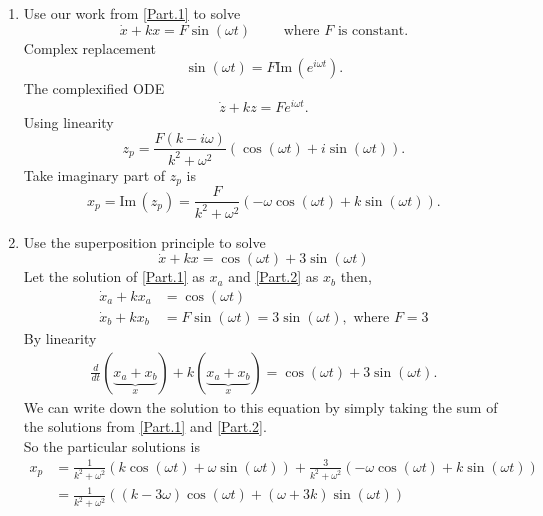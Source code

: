 \begin{enumerate}[label=\textbf{Part.\arabic*}]
\item \label{Part.2}Use our work from \ref{Part.1} to solve
  \begin{equation*}
    \dot{x} + kx = F \sin (\omega t) \qquad \text{ where } F \text{ is constant}.
  \end{equation*}
  Complex replacement
  \begin{equation*}
    \sin (\omega t) = F \mathrm{Im\, }(e^{i \omega t}).
  \end{equation*}
  The complexified ODE
  \begin{equation*}
    \dot{z} + kz = Fe^{i \omega t}. 
  \end{equation*}
  Using linearity
  \begin{equation*}
    z_ p = \frac{F \left(k - i \omega \right)}{k^2 + \omega ^2}
    \left( \cos (\omega t) + i \sin (\omega t) \right). 
  \end{equation*}
  Take imaginary part of $z_ p$ is
  \begin{equation*}
    x_ p = \mathrm{Im\, } (z_ p)
    = \frac{F}{k^2 + \omega ^2} \left( - \omega \cos (\omega t) + k \sin (\omega t) \right). 
  \end{equation*}
  
\item Use the superposition principle to solve
  \begin{equation*}
    \dot{x} + kx =  \cos (\omega t) + 3 \sin (\omega t)
  \end{equation*}
  Let the solution of \ref{Part.1} as $x_a$ and \ref{Part.2} as $x_b$ then,
  \begin{align*}
    \dot{x}_ a + kx_ a &= \cos (\omega t) \\
    \dot{x}_ b + kx_ b &= F \sin (\omega t) = 3 \sin (\omega t), \text{ where } F = 3
  \end{align*}
  By linearity
  \begin{align*}
    \frac{d}{dt} (\underbrace{x_ a + x_ b}_{x}) +
    k(\underbrace{x_ a + x_ b}_{x}) =  \cos (\omega t) + 3 \sin (\omega t). 
  \end{align*}
  We can write down the solution to this equation by simply taking
  the sum of the solutions from \ref{Part.1} and \ref{Part.2}. \\
  So the particular solutions is
  \begin{align*}
    x_ p &= \frac{1}{k^2 + \omega ^2} \left( k \cos (\omega t) + \omega \sin (\omega t) \right)
    + \frac{3}{k^2 + \omega ^2} \left( - \omega \cos (\omega t) + k \sin (\omega t) \right) \\
         &= \frac{1}{k^2 + \omega ^2} \left( \left(k -3 \omega \right) \cos(\omega t) +
           \left( \omega + 3k \right) \sin (\omega t) \right)    
  \end{align*}  
  

\end{enumerate}

